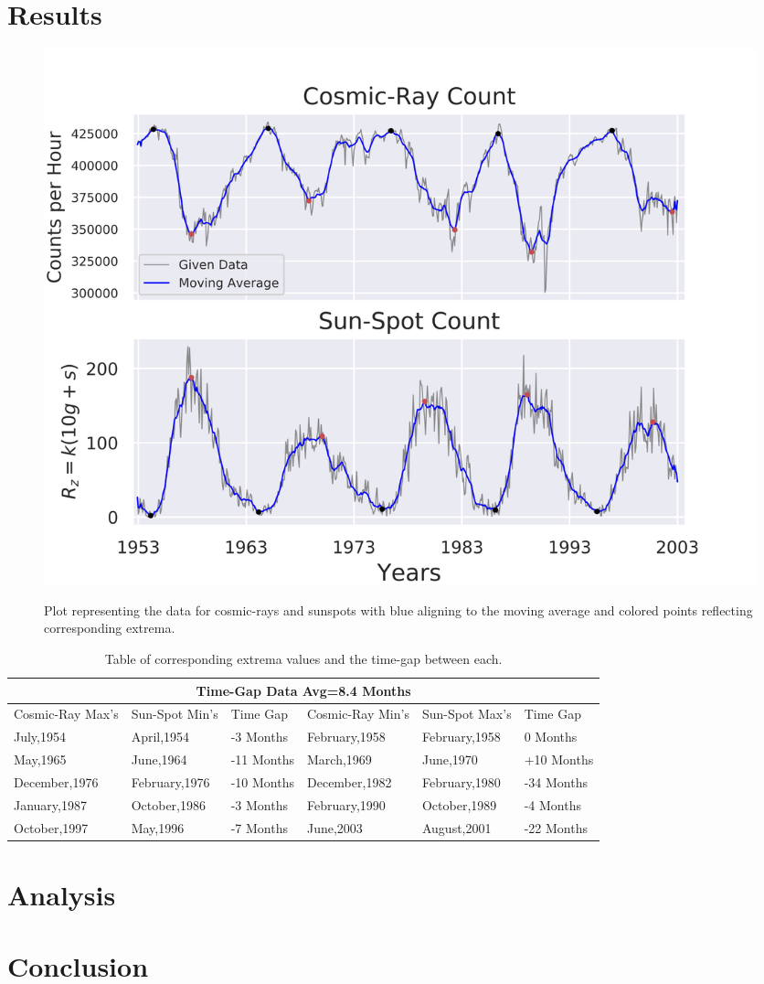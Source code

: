 \documentclass{article}
\begin{document}
\section{Results}
\begin{figure}[h!]
\centering
\caption{Plot representing the data for cosmic-rays and sunspots with
blue aligning to the moving average and colored points reflecting
corresponding extrema.}
\includegraphics[scale=0.7]{plot.png}
\label{fig:sundata}
\end{figure}
\begin{table}[h!]
 \centering
 \small
 \caption{Table of corresponding extrema values and the time-gap between each.}
 \label{tbl:timegap}
 \begin{tabular}{| p{2cm} |p{2cm} |p{1cm}||p{2cm}|p{2cm}|p{1cm}|  }
  \hline
  \multicolumn{6}{|c|}{Time-Gap Data Avg=8.4 Months} \\
  \hline
  Cosmic-Ray Max's&Sun-Spot Min's&Time Gap&Cosmic-Ray Min's&Sun-Spot Max's&Time Gap\\
  \hline
  July,1954&April,1954&-3 Months&February,1958&February,1958&0 Months\\
  May,1965&June,1964&-11 Months&March,1969&June,1970&+10 Months\\
  December,1976&February,1976&-10 Months&December,1982&February,1980&-34 Months\\
  January,1987&October,1986&-3 Months&February,1990&October,1989&-4 Months\\
  October,1997&May,1996&-7 Months&June,2003&August,2001&-22 Months\\
  \hline
 \end{tabular}
\end{table}
\newpage
\section{Analysis}


\newpage
\section{Conclusion}


\newpage


\end{document}
